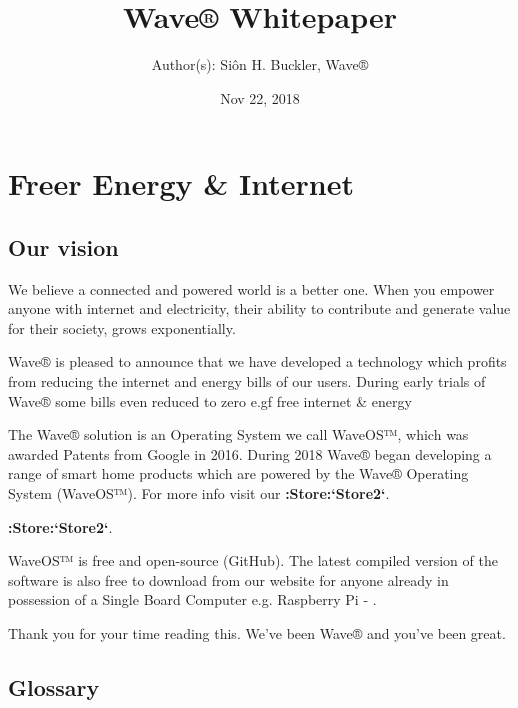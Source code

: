 \documentclass[letterpaper,10pt,english]{sphinxmanual}
\title{Wave® Whitepaper}
\date{Nov 22, 2018}
\author{Author(s): Siôn H. Buckler, Wave®}
\begin{document}
\pagestyle{empty}
\maketitle
\pagestyle{plain}
\sphinxtableofcontents
\pagestyle{normal}
\label{\detokenize{index::doc}}



\chapter{Freer Energy \& Internet}
\label{\detokenize{index:freer-energy-internet}}


\section{Our vision}
\label{\detokenize{index:our-vision}}
We believe a connected and powered world is a better one. When you empower anyone with internet and electricity, their ability to contribute and generate value for their society, grows exponentially.

Wave® is pleased to announce that we have developed a technology which profits from reducing the internet and energy bills of our users. During early trials of Wave® some bills even reduced to zero e.gf free internet \& energy

The Wave® solution is an Operating System we call WaveOS™, which was awarded Patents from Google in 2016. During 2018 Wave® began developing a range of smart home products which are powered by the Wave® Operating System (WaveOS™). For more info visit our {\color{red}\bfseries{}:Store:{}`Store2{}`}.

{\color{red}\bfseries{}:Store:{}`Store2{}`}.

WaveOS™ is free and open-source (GitHub). The latest compiled version of the software is also free to download from our website for anyone already in possession of a Single Board Computer e.g. Raspberry Pi - .

Thank you for your time reading this.
We’ve been Wave® and you’ve been great.


\section{Glossary}
\label{\detokenize{index:glossary}}
\end{document}
